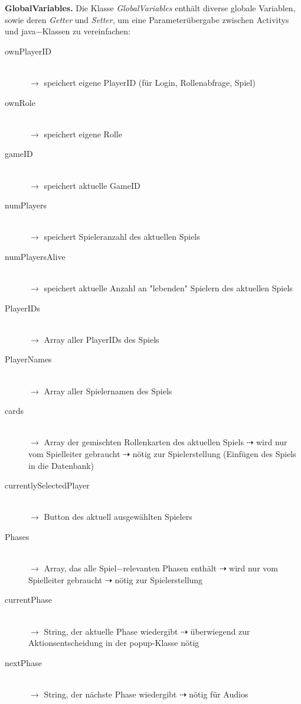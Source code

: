 \documentclass[12pt, a4paper]{article}
\begin{document}
\vspace{0,3 cm}

\textbf{GlobalVariables.}
Die Klasse \textit{GlobalVariables} enthält diverse globale Variablen, sowie deren \textit{Getter} und \textit{Setter}, um eine Parameterübergabe zwischen Activitys und java$-$Klassen zu vereinfachen:

\begin{description}
\item[ownPlayerID]\hfill \\ $\rightarrow$ speichert eigene PlayerID (für Login, Rollenabfrage, Spiel)
\item[ownRole]\hfill \\ $\rightarrow$ speichert eigene Rolle
\item[gameID]\hfill \\ $\rightarrow$ speichert aktuelle GameID
\item[numPlayers]\hfill \\ $\rightarrow$ speichert Spieleranzahl des aktuellen Spiels
\item[numPlayersAlive]\hfill \\ $\rightarrow$ speichert aktuelle Anzahl an "lebenden" Spielern des aktuellen Spiels
\item[PlayerIDs]\hfill \\ $\rightarrow$ Array aller PlayerIDs des Spiels
\item[PlayerNames]\hfill \\ $\rightarrow$ Array aller Spielernamen des Spiels
\item[cards]\hfill \\ $\rightarrow$ Array der gemischten Rollenkarten des aktuellen Spiels $\dashrightarrow$ wird nur vom Spielleiter gebraucht $\dashrightarrow$ nötig zur Spielerstellung (Einfügen des Spiels in die Datenbank)
\item[currentlySelectedPlayer]\hfill \\ $\rightarrow$ Button des aktuell ausgewählten Spielers
\item[Phases]\hfill \\ $\rightarrow$ Array, das alle Spiel$-$relevanten Phasen enthält $\dashrightarrow$ wird nur vom Spielleiter gebraucht $\dashrightarrow$ nötig zur Spielerstellung
\item[currentPhase]\hfill \\ $\rightarrow$ String, der aktuelle Phase wiedergibt $\dashrightarrow$ überwiegend zur Aktionsentscheidung in der popup-Klasse nötig
\item[nextPhase]\hfill \\ $\rightarrow$ String, der nächste Phase wiedergibt $\dashrightarrow$ nötig für Audios

\end{description}
\end{document}
